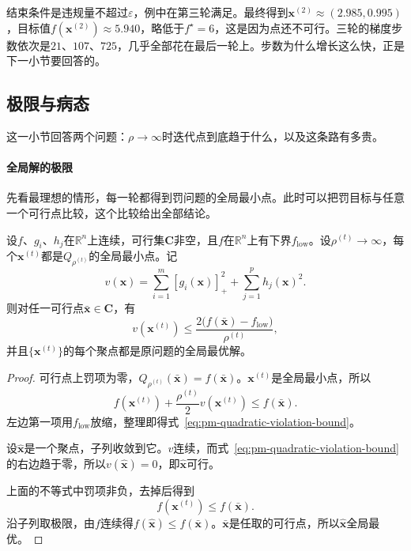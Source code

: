 结束条件是违规量不超过$\varepsilon$，例中在第三轮满足。最终得到$\bm{x}^{(2)}\approx(2.985,0.995)$，目标值$f(\bm{x}^{(2)})\approx5.940$，略低于$f^\star=6$，这是因为点还不可行。三轮的梯度步数依次是$21$、$107$、$725$，几乎全部花在最后一轮上。步数为什么增长这么快，正是下一小节要回答的。

\subsection{极限与病态}
\label{sec:pm-limit}

这一小节回答两个问题：$\rho\to\infty$时迭代点到底趋于什么，以及这条路有多贵。

\paragraph{全局解的极限}
先看最理想的情形，每一轮都得到罚问题的全局最小点。此时可以把罚目标与任意一个可行点比较，这个比较给出全部结论。

\begin{theorem}[二次惩罚法的全局极限]
\label{thm:pm-quadratic-limit}
设$f$、$g_i$、$h_j$在$\mathbb{R}^n$上连续，可行集$\bm{C}$非空，且$f$在$\mathbb{R}^n$上有下界$f_{\mathrm{low}}$。设$\rho^{(t)}\to\infty$，每个$\bm{x}^{(t)}$都是$Q_{\rho^{(t)}}$的全局最小点。记
\begin{equation}
 v(\bm{x})=\sum_{i=1}^m[g_i(\bm{x})]_+^2+\sum_{j=1}^ph_j(\bm{x})^2 .
 \label{eq:pm-violation-square}
\end{equation}
则对任一可行点$\bar{\bm{x}}\in\bm{C}$，有
\begin{equation}
 v(\bm{x}^{(t)})\leq\frac{2\bigl(f(\bar{\bm{x}})-f_{\mathrm{low}}\bigr)}{\rho^{(t)}},
 \label{eq:pm-quadratic-violation-bound}
\end{equation}
并且$\{\bm{x}^{(t)}\}$的每个聚点都是原问题的全局最优解。
\end{theorem}

\begin{proof}
可行点上罚项为零，$Q_{\rho^{(t)}}(\bar{\bm{x}})=f(\bar{\bm{x}})$。$\bm{x}^{(t)}$是全局最小点，所以
\[
 f(\bm{x}^{(t)})+\frac{\rho^{(t)}}{2}v(\bm{x}^{(t)})\leq f(\bar{\bm{x}}).
\]
左边第一项用$f_{\mathrm{low}}$放缩，整理即得式~\eqref{eq:pm-quadratic-violation-bound}。

设$\hat{\bm{x}}$是一个聚点，子列收敛到它。$v$连续，而式~\eqref{eq:pm-quadratic-violation-bound}的右边趋于零，所以$v(\hat{\bm{x}})=0$，即$\hat{\bm{x}}$可行。

上面的不等式中罚项非负，去掉后得到
\[
 f(\bm{x}^{(t)})\leq f(\bar{\bm{x}}).
\]
沿子列取极限，由$f$连续得$f(\hat{\bm{x}})\leq f(\bar{\bm{x}})$。$\bar{\bm{x}}$是任取的可行点，所以$\hat{\bm{x}}$全局最优。
\end{proof}

